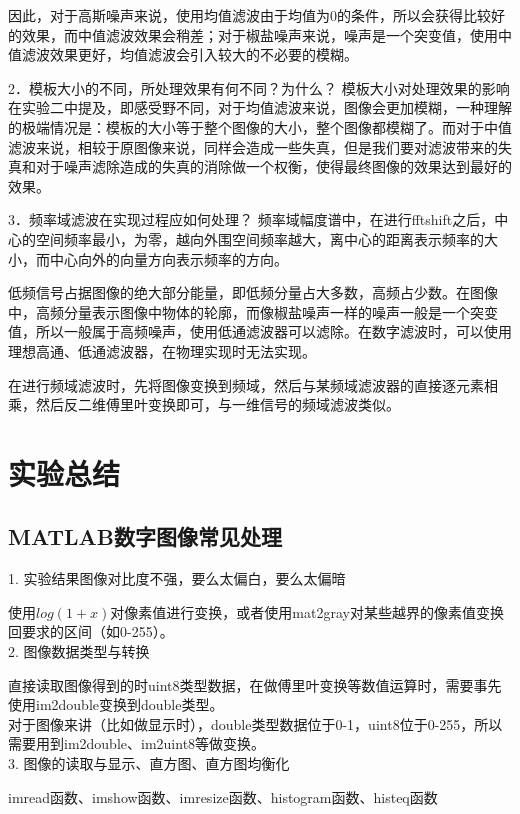 \documentclass[UTF8]{article} %
\begin{document}
	因此，对于高斯噪声来说，使用均值滤波由于均值为0的条件，所以会获得比较好的效果，而中值滤波效果会稍差；对于椒盐噪声来说，噪声是一个突变值，使用中值滤波效果更好，均值滤波会引入较大的不必要的模糊。
	
	2．模板大小的不同，所处理效果有何不同？为什么？
	模板大小对处理效果的影响在实验二中提及，即感受野不同，对于均值滤波来说，图像会更加模糊，一种理解的极端情况是：模板的大小等于整个图像的大小，整个图像都模糊了。而对于中值滤波来说，相较于原图像来说，同样会造成一些失真，但是我们要对滤波带来的失真和对于噪声滤除造成的失真的消除做一个权衡，使得最终图像的效果达到最好的效果。
	
	3．频率域滤波在实现过程应如何处理？ 
	频率域幅度谱中，在进行fftshift之后，中心的空间频率最小，为零，越向外围空间频率越大，离中心的距离表示频率的大小，而中心向外的向量方向表示频率的方向。
	
	低频信号占据图像的绝大部分能量，即低频分量占大多数，高频占少数。在图像中，高频分量表示图像中物体的轮廓，而像椒盐噪声一样的噪声一般是一个突变值，所以一般属于高频噪声，使用低通滤波器可以滤除。在数字滤波时，可以使用理想高通、低通滤波器，在物理实现时无法实现。
	
	在进行频域滤波时，先将图像变换到频域，然后与某频域滤波器的直接逐元素相乘，然后反二维傅里叶变换即可，与一维信号的频域滤波类似。

	\section{实验总结}
	\subsection{MATLAB数字图像常见处理}
	1. 实验结果图像对比度不强，要么太偏白，要么太偏暗
	
	使用$log(1+x)$对像素值进行变换，或者使用mat2gray对某些越界的像素值变换回要求的区间（如0-255）。\\
	
	2. 图像数据类型与转换
	
	直接读取图像得到的时uint8类型数据，在做傅里叶变换等数值运算时，需要事先使用im2double变换到double类型。\\
	
	对于图像来讲（比如做显示时），double类型数据位于0-1，uint8位于0-255，所以需要用到im2double、im2uint8等做变换。\\
	
	3. 图像的读取与显示、直方图、直方图均衡化
	
	imread函数、imshow函数、imresize函数、histogram函数、histeq函数\\
	
\end{document}
